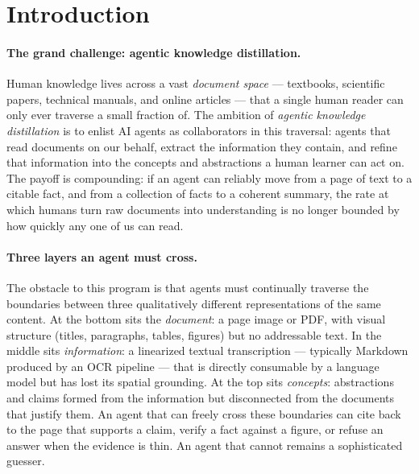 \documentclass{article}
\theoremstyle{definition}
\begin{document}

\section{Introduction}
\label{sec:intro}

\paragraph{The grand challenge: agentic knowledge distillation.}
Human knowledge lives across a vast \emph{document space} --- textbooks,
scientific papers, technical manuals, and online articles --- that a
single human reader can only ever traverse a small fraction of.  The
ambition of \emph{agentic knowledge distillation} is to enlist AI
agents as collaborators in this traversal: agents that read
documents on our behalf, extract the information they contain, and
refine that information into the concepts and abstractions a human
learner can act on.  The payoff is compounding: if an agent can
reliably move from a page of text to a citable fact, and from a
collection of facts to a coherent summary, the rate at which humans
turn raw documents into understanding is no longer bounded by how
quickly any one of us can read.

\paragraph{Three layers an agent must cross.}
The obstacle to this program is that agents must continually
traverse the boundaries between three qualitatively different
representations of the same content.  At the bottom sits the
\emph{document}: a page image or PDF, with visual structure
(titles, paragraphs, tables, figures) but no addressable text.  In
the middle sits \emph{information}: a linearized textual
transcription --- typically Markdown produced by an OCR pipeline ---
that is directly consumable by a language model but has lost its
spatial grounding.  At the top sits \emph{concepts}: abstractions
and claims formed from the information but disconnected from the
documents that justify them.  An agent that can freely cross these
boundaries can cite back to the page that supports a claim, verify a
fact against a figure, or refuse an answer when the evidence is
thin.  An agent that cannot remains a sophisticated guesser.
\end{document}
